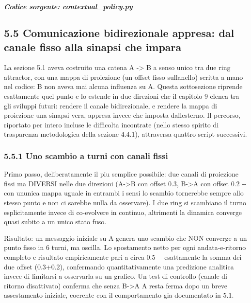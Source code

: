 \documentclass[
  italian,
]{article}
\begin{document}
\textit{\textbf{Codice sorgente: contextual\_\allowbreak{}policy.py}}


\subsection{5.5 Comunicazione bidirezionale appresa: dal canale fisso alla sinapsi che impara}\label{comunicazione-bidirezionale-appresa-dal-canale-fisso-alla-sinapsi-che-impara}

La sezione 5.1 aveva costruito una catena A -\textgreater{} B a senso unico tra due ring attractor, con una mappa di proiezione (un offset fisso sull\textquotesingle anello) scritta a mano nel codice: B non aveva mai alcuna influenza su A. Questa sottosezione riprende esattamente quel punto e lo estende in due direzioni che il capitolo 9 elenca tra gli sviluppi futuri: rendere il canale bidirezionale, e rendere la mappa di proiezione una sinapsi vera, appresa invece che imposta dall\textquotesingle esterno. Il percorso, riportato per intero incluse le difficolta\textquotesingle{} incontrate (nello stesso spirito di trasparenza metodologica della sezione 4.4.1), attraversa quattro script successivi.

\subsubsection{5.5.1 Uno scambio a turni con canali fissi}\label{uno-scambio-a-turni-con-canali-fissi}

Primo passo, deliberatamente il piu\textquotesingle{} semplice possibile: due canali di proiezione fissi ma DIVERSI nelle due direzioni (A-\textgreater B con offset 0.3, B-\textgreater A con offset 0.2 -\/- con un\textquotesingle unica mappa uguale in entrambi i sensi lo scambio tornerebbe sempre allo stesso punto e non ci sarebbe nulla da osservare). I due ring si scambiano il turno esplicitamente invece di co-evolvere in continuo, altrimenti la dinamica converge quasi subito a un unico stato fuso.

Risultato: un messaggio iniziale su A genera uno scambio che NON converge a un punto fisso in 6 turni, ma oscilla. Lo spostamento netto per ogni andata-e-ritorno completo e\textquotesingle{} risultato empiricamente pari a circa 0.5 -\/- esattamente la somma dei due offset (0.3+0.2), confermando quantitativamente una predizione analitica invece di limitarsi a osservarla su un grafico. Un test di controllo (canale di ritorno disattivato) conferma che senza B-\textgreater A A resta ferma dopo un breve assestamento iniziale, coerente con il comportamento gia\textquotesingle{} documentato in 5.1.
\end{document}
